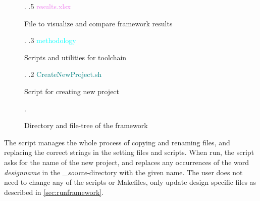 \begin{figure}
\begin{minipage}{0.99\textwidth}
{\begin{minipage}[t]{5.4cm}
                                                            \end{minipage}. 
    .5 \textcolor{violet}{results{.}xlsx} \dotfill \:\:\begin{minipage}[t]{5.4cm}
                                                            File to visualize and compare framework results
                                                            \end{minipage}. 
    .3 \textcolor{cyan}{methodology} \dotfill \:\:\begin{minipage}[t]{5.4cm}
                                                            Scripts and utilities for toolchain
                                                            \end{minipage}. 
    .2 \textcolor{teal}{CreateNewProject{.}sh} \dotfill \:\:\begin{minipage}[t]{5.4cm}
                                                            Script for creating new project
                                                            \end{minipage}. 
    }
\end{minipage}
\caption{Directory and file-tree of the framework}
\label{fig:frameworkdirtree}
\end{figure}
The script manages the whole process of copying and renaming files, and replacing the correct strings in the setting files and scripts. When run, the script asks for the name of the new project, and replaces any occurrences of the word \textit{designname} in the \textit{\_source}-directory with the given name. The user does not need to change any of the scripts or Makefiles, only update design specific files as described in \cref{sec:runframework}.

